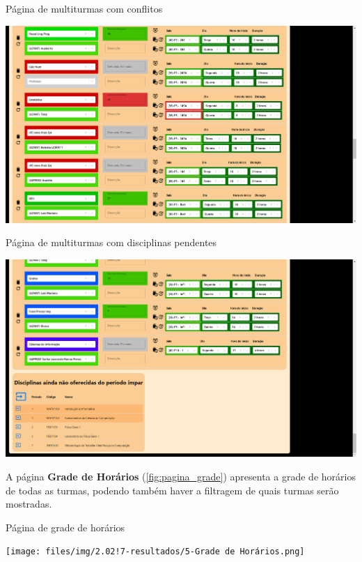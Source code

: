 \begin{MyCenteredFigure} \caption{Página de multiturmas com conflitos} \label{fig:pagina_multiConflitos}
  \includegraphics[width=\textwidth]{files/img/2.02!7-resultados/3-Multiturmas-Conflitos.png}
\end{MyCenteredFigure}

\begin{MyCenteredFigure} \caption{Página de multiturmas com disciplinas pendentes} \label{fig:pagina_multiDisciplinas}
  \includegraphics[width=\textwidth]{files/img/2.02!7-resultados/4-Multiturmas-DisciplinasPendentes.png}
\end{MyCenteredFigure}

A página \textbf{Grade de Horários} (\autoref{fig:pagina_grade}) apresenta a grade de horários de todas as turmas, podendo também haver a filtragem de quais turmas serão mostradas.

\begin{MyCenteredFigure} \caption{Página de grade de horários} \label{fig:pagina_grade}
  \texttt{[image: files/img/2.02!7-resultados/5-Grade de Horários.png]}
\end{MyCenteredFigure}

